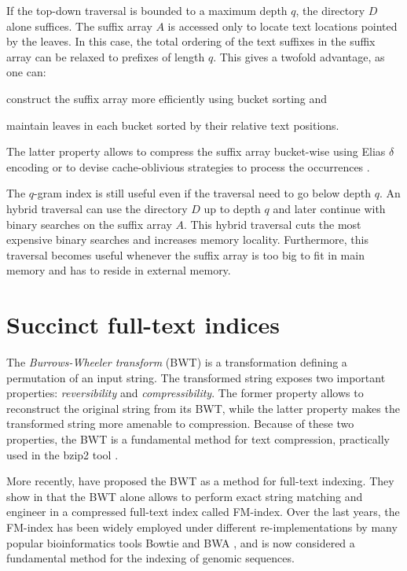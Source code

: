 If the top-down traversal is bounded to a maximum depth $q$, the directory $D$ alone suffices.
The suffix array $A$ is accessed only to locate text locations pointed by the leaves.
In this case, the total ordering of the text suffixes in the suffix array can be relaxed to prefixes of length $q$.
This gives a twofold advantage, as one can:
\begin{inparaenum}[(i)]
\item construct the suffix array more efficiently using bucket sorting and
\item maintain leaves in each bucket sorted by their relative text positions.
\end{inparaenum}
The latter property allows to compress the suffix array bucket-wise \eg using Elias $\delta$ encoding \citep{Elias1975} or to devise cache-oblivious strategies to process the occurrences \citep{Hach2010}.

The $q$-gram index is still useful even if the traversal need to go below depth $q$.
An hybrid traversal can use the directory $D$ up to depth $q$ and later continue with binary searches on the suffix array $A$.
This hybrid traversal cuts the most expensive binary searches and increases memory locality.
Furthermore, this traversal becomes useful whenever the suffix array is too big to fit in main memory and has to reside in external memory.

\section{Succinct full-text indices}

The \emph{Burrows-Wheeler transform} (BWT) \citep{Burrows1994} is a transformation defining a permutation of an input string.
The transformed string exposes two important properties: \emph{reversibility} and \emph{compressibility}.
The former property allows to reconstruct the original string from its BWT, while the latter property makes the transformed string more amenable to compression.
Because of these two properties, the BWT is a fundamental method for text compression, practically used in the bzip2 tool \citep{Seward1996}.

More recently, \citeauthor{Ferragina2000} have proposed the BWT as a method for full-text indexing.
They show in \citep{Ferragina2000} that the BWT alone allows to perform exact string matching and engineer in \citep{Ferragina2001} a compressed full-text index called FM-index.
Over the last years, the FM-index has been widely employed under different re-implementations by many popular bioinformatics tools \eg Bowtie \citep{Langmead2009} and BWA \citep{Li2009}, and is now considered a fundamental method for the indexing of genomic sequences.

